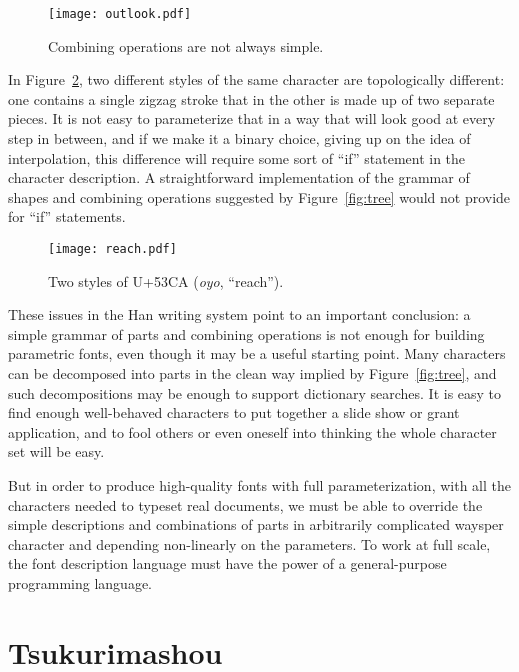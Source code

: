 \documentclass{ltugboat}
\begin{document}
\begin{figure}
\texttt{[image: outlook.pdf]}
\caption{Combining operations are not always simple.}
\label{fig:outlook}
\end{figure}

In Figure~\ref{fig:reach}, two different styles of the same character are
topologically different: one contains a single zigzag stroke that in the
other is made up of two separate pieces.  It is not easy to parameterize
that in a way that will look good at every step in between, and if we
make it a binary choice, giving up on the idea of interpolation, this
difference will require some sort of ``if'' statement in the character
description.  A straightforward implementation of the grammar of shapes and
combining operations suggested by Figure~\ref{fig:tree} would not provide
for ``if'' statements.

\begin{figure}
\texttt{[image: reach.pdf]}
\caption{Two styles of U+53CA (\emph{oyo}, ``reach'').}
\label{fig:reach}
\end{figure}

These issues in the Han writing system point to an important conclusion:  a
simple grammar of parts and combining operations is not enough for building
parametric fonts, even though it may be a useful starting point.  Many
characters can be decomposed into parts in the clean way implied by
Figure~\ref{fig:tree}, and such decompositions may be enough to support
dictionary searches.  It is easy to find enough well-behaved characters to
put together a slide show or grant application, and to fool others or even
oneself into thinking the whole character set will be easy.

But in order to produce high-quality fonts with full parameterization, with
all the characters needed to typeset real documents, we must be able to
override the simple descriptions and combinations of
\linebreak%
 parts in arbitrarily
complicated ways\Dash per character and depending non-linearly on the
parameters.  To work at full scale, the font description language must have
the power of a general-purpose programming language.


\section{Tsukurimashou}
\end{document}
